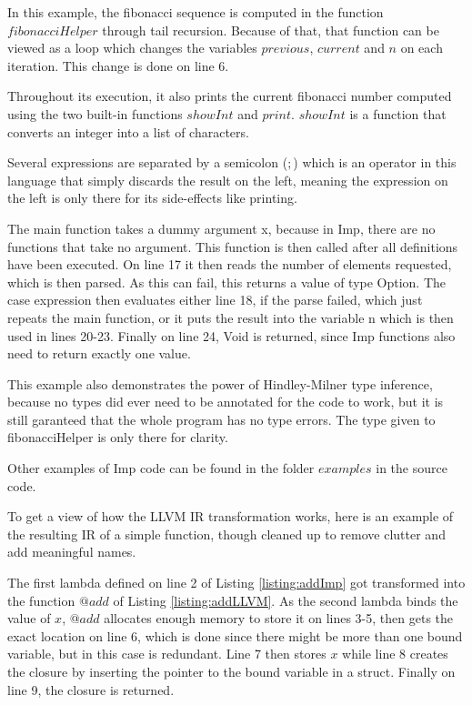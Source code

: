 \documentclass[12pt]{article}
\begin{document}
In this example, the fibonacci sequence is computed in the function
$fibonacciHelper$ through tail recursion. Because of that, that function
can be viewed as a loop which changes the variables $previous$, $current$ and
$n$ on each iteration. This change is done on line 6.

Throughout its execution, it also prints the current fibonacci number
computed using the two built-in functions $showInt$ and $print$.
$showInt$ is a function that converts an integer into a list of characters.

Several expressions are separated by a semicolon ($;$) which is an operator
in this language that simply discards the result on the left, meaning
the expression on the left is only there for its side-effects like printing.

The main function takes a dummy argument x, because in Imp, there are no
functions that take no argument. This function is then called
after all definitions have been executed.
On line 17 it then reads the number of elements requested,
which is then parsed. As this can fail, this returns a
value of type Option. The case expression then evaluates either line
18, if the parse failed, which just repeats the main function,
or it puts the result into the variable n which is then used in
lines 20-23. Finally on line 24, Void is returned, since Imp functions
also need to return exactly one value.

This example also demonstrates the power of Hindley-Milner type inference,
because no types did ever need to be annotated for the code to work,
but it is still garanteed that the whole program has no type errors.
The type given to fibonacciHelper is only there for clarity.

Other examples of Imp code can be found in the folder $examples$ in
the source code.

To get a view of how the LLVM IR transformation works, here is
an example of the resulting IR of a simple function,
though cleaned up to remove clutter and add meaningful names.

\begin{minipage}{\linewidth}
	
	
\end{minipage}

The first lambda defined on line 2 of Listing \ref{listing:addImp} got transformed
into the function $@add$ of Listing \ref{listing:addLLVM}.
As the second lambda binds the value of $x$, $@add$ allocates
enough memory to store it on lines 3-5, then gets the exact location on line 6, which
is done since there might be more than one bound variable, but in this case is redundant.
Line 7 then stores $x$ while line 8 creates the closure by inserting the pointer to the bound
variable in a struct.
Finally on line 9, the closure is returned.
\end{document}
